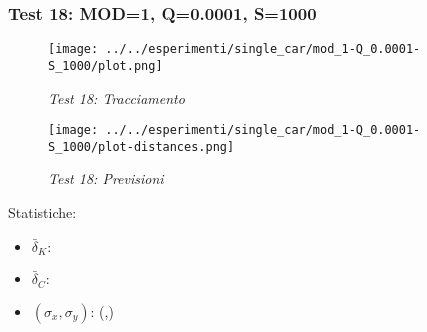\newpage
\subsubsection{Test 18: MOD=1, Q=0.0001, S=1000}

\begin{figure}[hb]
\centering
\texttt{[image: ../../esperimenti/single\_car/mod\_1-Q\_0.0001-S\_1000/plot.png]}
\caption{\textit{Test 18: Tracciamento}}
\end{figure}

\begin{figure}[hb]
\centering
\texttt{[image: ../../esperimenti/single\_car/mod\_1-Q\_0.0001-S\_1000/plot-distances.png]}
\caption{\textit{Test 18: Previsioni}}
\end{figure}

Statistiche:
\begin{itemize}
\item \begin{math} \bar \delta_K:  \end{math}
\item \begin{math} \bar \delta_C:  \end{math}
\item \begin{math}(\sigma_x,\sigma_y)\end{math}: (,)
\end{itemize}

